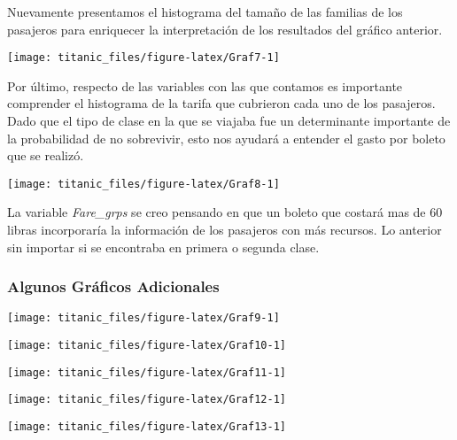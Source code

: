 \documentclass[
]{article}
\begin{document}
Nuevamente presentamos el histograma del tamaño de las familias de los
pasajeros para enriquecer la interpretación de los resultados del
gráfico anterior.

\begin{center}\texttt{[image: titanic\_files/figure-latex/Graf7-1]} \end{center}

Por último, respecto de las variables con las que contamos es importante
comprender el histograma de la tarifa que cubrieron cada uno de los
pasajeros. Dado que el tipo de clase en la que se viajaba fue un
determinante importante de la probabilidad de no sobrevivir, esto nos
ayudará a entender el gasto por boleto que se realizó.

\begin{center}\texttt{[image: titanic\_files/figure-latex/Graf8-1]} \end{center}

La variable \emph{Fare\_grps} se creo pensando en que un boleto que
costará mas de 60 libras incorporaría la información de los pasajeros
con más recursos. Lo anterior sin importar si se encontraba en primera o
segunda clase.

\hypertarget{algunos-gruxe1ficos-adicionales}{%
\subsubsection{Algunos Gráficos
Adicionales}\label{algunos-gruxe1ficos-adicionales}}

\begin{center}\texttt{[image: titanic\_files/figure-latex/Graf9-1]} \end{center}

\begin{center}\texttt{[image: titanic\_files/figure-latex/Graf10-1]} \end{center}

\begin{center}\texttt{[image: titanic\_files/figure-latex/Graf11-1]} \end{center}

\begin{center}\texttt{[image: titanic\_files/figure-latex/Graf12-1]} \end{center}

\begin{center}\texttt{[image: titanic\_files/figure-latex/Graf13-1]} \end{center}
\end{document}

